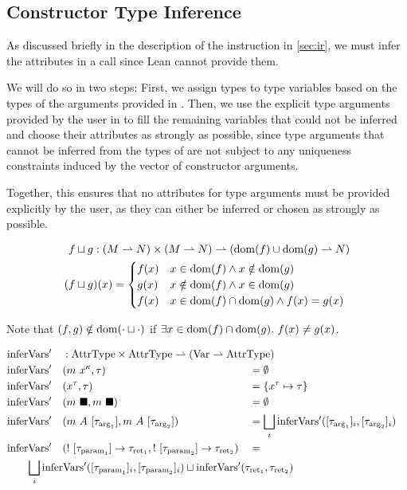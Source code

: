 \subsection{Constructor Type Inference}

As discussed briefly in the description of the  instruction in \cref{sec:ir}, we must infer the attributes in a  call since Lean cannot provide them. 

We will do so in two steps: First, we assign types to type variables based on the types of the arguments provided in \icode{[y]}. Then, we use the explicit type arguments provided by the user in \icode{[τ?]} to fill the remaining variables that could not be inferred and choose their attributes as strongly as possible, since type arguments that cannot be inferred from the types of \icode{[y]} are not subject to any uniqueness constraints induced by the vector of constructor arguments. 

Together, this ensures that no attributes for type arguments must be provided explicitly by the user, as they can either be inferred or chosen as strongly as possible.

\begin{alignat*}{3}
	f &\sqcup g : (M \rightharpoonup N) \times (M \rightharpoonup N) \rightharpoonup (\mathrm{dom}(f) \cup \mathrm{dom}(g) \rightharpoonup N) \\
	(f &\sqcup g)(x) = \begin{cases}
		f(x) & x \in \mathrm{dom}(f) \land x \notin \mathrm{dom}(g) \\
		g(x) & x \notin \mathrm{dom}(f) \land x \in \mathrm{dom}(g) \\
		f(x) & x \in \mathrm{dom}(f) \cap \mathrm{dom}(g) \land f(x) = g(x)
	\end{cases}
\end{alignat*}

Note that $(f, g) \notin \mathrm{dom}(\cdot \sqcup \cdot)$ if $\exists x \in \mathrm{dom}(f) \cap \mathrm{dom}(g).\ f(x) \neq g(x)$.

\newcommand{\inferVarsDash}{\mathrm{inferVars'}}

\begin{alignat*}{3}
	&\inferVarsDash &&: \mathrlap{\AttrType \times \AttrType \rightharpoonup (\Var \rightharpoonup \AttrType)} \\
	&\inferVarsDash&&(m\ x^\kappa, \tau) &&= \emptyset \\
	&\inferVarsDash&&(x^\tau, \tau) &&= \{ x^\tau \mapsto \tau \} \\
	&\inferVarsDash&&(m\ \blacksquare, m\ \blacksquare) &&= \emptyset \\
	&\inferVarsDash&&(m\ A\ [\tau_{\arrg_1}], m\ A\ [\tau_{\arrg_2}]) &&= \bigsqcup_i \inferVarsDash([\tau_{\arrg_1}]_i, [\tau_{\arrg_2}]_i) \\
	&\inferVarsDash&&(!\ [\tau_{\param_1}] \to \tau_{\ret_1}, !\ [\tau_{\param_2}] \to \tau_{\ret_2}) &&= \\
	&\rebreak{\bigsqcup_i \inferVarsDash([\tau_{\param_1}]_i, [\tau_{\param_2}]_i) \sqcup \inferVarsDash(\tau_{\ret_1}, \tau_{\ret_2})}
\end{alignat*}

